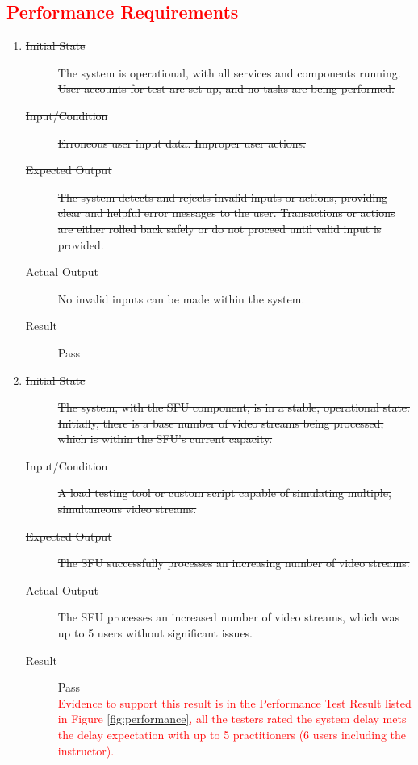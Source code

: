 \documentclass[12pt, titlepage]{article}
\newcommand{\rt}[1]{\textcolor{red}{#1}}
\begin{document}
\rt{\subsection{Performance Requirements}}
\begin{enumerate}
\item \label{NFRT4}
  \begin{description}
  \item[\sout{Initial State}] \sout{The system is operational, with all
      services and components running. User accounts for test are set up,
      and no tasks are being performed.}
  \item[\sout{Input/Condition}] \sout{Erroneous user input data. Improper user
      actions.}
  \item[\sout{Expected Output}] \sout{The system detects and rejects invalid
      inputs or actions, providing clear and helpful error messages to the
      user. Transactions or actions are either rolled back safely or do not
      proceed until valid input is provided.}
  \item[Actual Output] No invalid inputs can be made within the system.
  \item[Result] Pass
  \end{description}
\item \label{NFRT6}
  \begin{description}
  \item[\sout{Initial State}] \sout{The system, with the SFU component, is in a
      stable, operational state. Initially, there is a base number of video
      streams being processed, which is within the SFU's current capacity.}
  \item[\sout{Input/Condition}] \sout{A load testing tool or custom script
      capable of simulating multiple, simultaneous video streams.}
  \item[\sout{Expected Output}] \sout{The SFU successfully processes an
      increasing number of video streams.}
  \item[Actual Output] The SFU processes an increased number of video streams,
    which was up to 5 users without significant issues.
  \item[Result] Pass \\
  \rt{Evidence to support this result is in the Performance Test Result listed in Figure \ref{fig:performance},
  all the testers rated the system delay mets the delay expectation with up to 5 practitioners (6 users including the instructor).}
  \end{description}

\end{enumerate}
\end{document}
